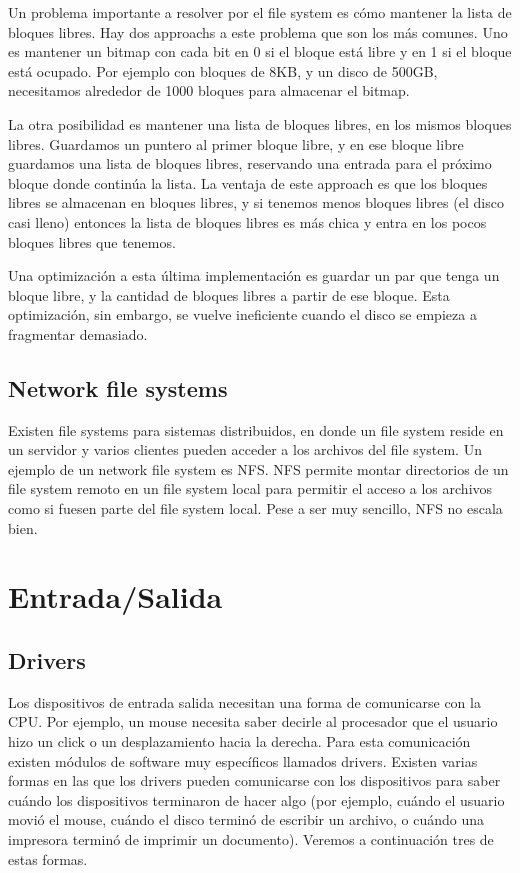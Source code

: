 \documentclass{article}
\begin{document}
Un problema importante a resolver por el file system es c\'omo mantener la lista de bloques libres. Hay dos approachs a este problema que son los m\'as comunes. Uno es mantener un bitmap con cada bit en 0 si el bloque est\'a libre y en 1 si el bloque est\'a ocupado. Por ejemplo con bloques de 8KB, y un disco de 500GB, necesitamos alrededor de 1000 bloques para almacenar el bitmap.

La otra posibilidad es mantener una lista de bloques libres, en los mismos bloques libres. Guardamos un puntero al primer bloque libre, y en ese bloque libre guardamos una lista de bloques libres, reservando una entrada para el pr\'oximo bloque donde contin\'ua la lista. La ventaja de este approach es que los bloques libres se almacenan en bloques libres, y si tenemos menos bloques libres (el disco casi lleno) entonces la lista de bloques libres es m\'as chica y entra en los pocos bloques libres que tenemos.

Una optimizaci\'on a esta \'ultima implementaci\'on es guardar un par que tenga un bloque libre, y la cantidad de bloques libres a partir de ese bloque. Esta optimizaci\'on, sin embargo, se vuelve ineficiente cuando el disco se empieza a fragmentar demasiado.

\subsection{Network file systems}

Existen file systems para sistemas distribuidos, en donde un file system reside en un servidor y varios clientes pueden acceder a los archivos del file system. Un ejemplo de un network file system es NFS. NFS permite montar directorios de un file system remoto en un file system local para permitir el acceso a los archivos como si fuesen parte del file system local. Pese a ser muy sencillo, NFS no escala bien.

\section{Entrada/Salida}

\subsection{Drivers}

Los dispositivos de entrada salida necesitan una forma de comunicarse con la CPU. Por ejemplo, un mouse necesita saber decirle al procesador que el usuario hizo un click o un desplazamiento hacia la derecha. Para esta comunicaci\'on existen m\'odulos de software muy espec\'ificos llamados drivers. Existen varias formas en las que los drivers pueden comunicarse con los dispositivos para saber cu\'ando los dispositivos terminaron de hacer algo (por ejemplo, cu\'ando el usuario movi\'o el mouse, cu\'ando el disco termin\'o de escribir un archivo, o cu\'ando una impresora termin\'o de imprimir un documento). Veremos a continuaci\'on tres de estas formas.
\end{document}
